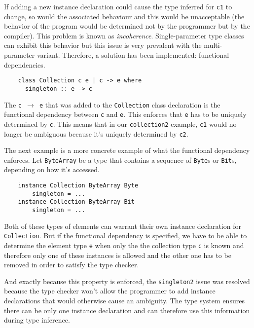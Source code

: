If adding a new instance declaration could cause the type inferred for
\texttt{c1} to change, so would the associated behaviour and this would be
unacceptable (the behavior of the program would be determined not by the programmer but by the compiler). This problem is known as {\em incoherence}.
Single-parameter type classes can exhibit this behavior
but this issue is very prevalent with the
multi-parameter variant. Therefore, a solution has been implemented: functional
dependencies.
\begin{verbatim}
    class Collection c e | c -> e where
      singleton :: e -> c
\end{verbatim}
The \texttt{c $\rightarrow$ e} that was added to the \texttt{Collection} class
declaration is the functional dependency between \texttt{c} and \texttt{e}. This
enforces that \texttt{e} has to be uniquely determined by \texttt{c}.
This means that in our \texttt{collection2} example, \texttt{c1} would no longer
be ambiguous because it's uniquely determined by \texttt{c2}.

The next example is a more concrete example of what the functional dependency
enforces. Let \texttt{ByteArray} be a type that contains a sequence of
\texttt{Byte}s or \texttt{Bit}s, depending on how it's accessed.
\begin{verbatim}
    instance Collection ByteArray Byte
        singleton = ...
    instance Collection ByteArray Bit
        singleton = ...
\end{verbatim}
Both of these types of elements can warrant their own instance declaration for
\texttt{Collection}. But if the functional dependency is specified, we have to
be able to determine the element type \texttt{e} when only the the collection
type \texttt{c} is known and therefore only one of these instances is allowed
and the other one has to be removed in order to satisfy the type checker.

And exactly because this property is enforced, the \texttt{singleton2} issue was
resolved because the type checker won't allow the programmer to add instance
declarations that would otherwise cause an ambiguity. The type system ensures
there can be only one instance declaration and can therefore use this
information during type inference.

